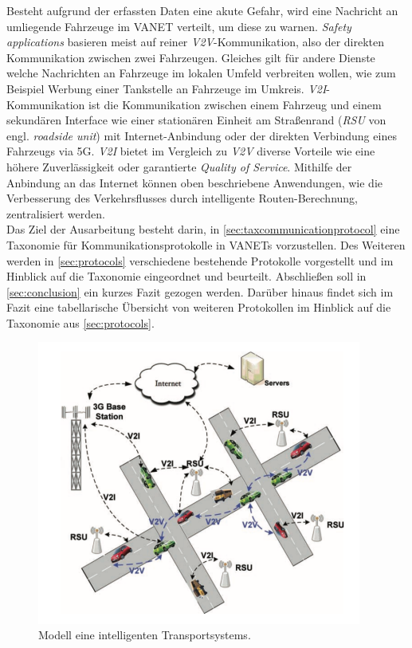 \documentclass[english,runningheads,a4paper]{llncs}[2018/03/10]
\begin{document}
Besteht aufgrund der erfassten Daten eine akute Gefahr, wird eine Nachricht an umliegende Fahrzeuge im VANET verteilt, um diese zu warnen.
\textit{Safety applications} basieren meist auf reiner \textit{V2V}-Kommunikation, also der direkten Kommunikation zwischen zwei Fahrzeugen.
Gleiches gilt für andere Dienste welche Nachrichten an Fahrzeuge im lokalen Umfeld verbreiten wollen, wie zum Beispiel Werbung einer Tankstelle an Fahrzeuge im Umkreis.
\textit{V2I}-Kommunikation ist die Kommunikation zwischen einem Fahrzeug und einem sekundären Interface wie einer stationären Einheit am Straßenrand (\textit{RSU} von engl. \textit{roadside unit}) mit Internet-Anbindung oder der direkten Verbindung eines Fahrzeugs via 5G\@.
\textit{V2I} bietet im Vergleich zu \textit{V2V} diverse Vorteile wie eine höhere Zuverlässigkeit oder garantierte \textit{Quality of Service}.
Mithilfe der Anbindung an das Internet können oben beschriebene Anwendungen, wie die Verbesserung des Verkehrsflusses durch intelligente Routen-Berechnung, zentralisiert werden\cite{conti2013mobile}.\\
Das Ziel der Ausarbeitung besteht darin, in \ref{sec:taxcommunicationprotocol} eine Taxonomie für Kommunikationsprotokolle in VANETs vorzustellen.
Des Weiteren werden in \ref{sec:protocols} verschiedene bestehende Protokolle vorgestellt und im Hinblick auf die Taxonomie eingeordnet und beurteilt.
Abschließen soll in \ref{sec:conclusion} ein kurzes Fazit gezogen werden.
Darüber hinaus findet sich im Fazit eine tabellarische Übersicht von weiteren Protokollen im Hinblick auf die Taxonomie aus \ref{sec:protocols}.

\begin{figure}[h]
  \centering
  \includegraphics[width=0.95\textwidth]{images/its-modell.png}
  \caption{Modell eine intelligenten Transportsystems\cite{conti2013mobile}.}
  \label{fig:its-modell}
\end{figure}
\end{document}

